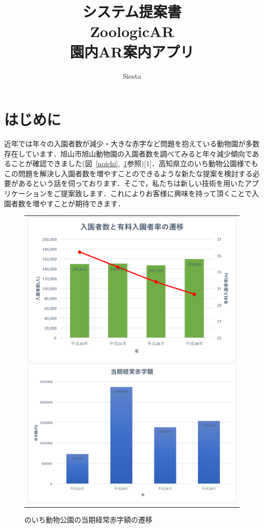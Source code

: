 \documentclass[a4j]{jarticle}
\title{
\vspace{30mm}
{\bf システム提案書} 
\\
\vspace{5mm}
{\bf ZoologicAR \\園内AR案内アプリ}
\vspace{90mm}
}
\author{
\vspace{5mm}
Siesta \\
}
\begin{document}
\maketitle

\newpage

\tableofcontents

\newpage

\section{はじめに}
近年では年々の入園者数が減少・大きな赤字など問題を抱えている動物園が多数存在しています．旭山市旭山動物園の入園者数を調べてみると年々減少傾向であることが確認できました(図~\ref{noichi},~\ref{noichi_akaji}参照)[1]．高知県立のいち動物公園様でもこの問題を解決し入園者数を増やすことのできるような新たな提案を検討する必要があるという話を伺っております．そこで，私たちは新しい技術を用いたアプリケーションをご提案致します．これによりお客様に興味を持って頂くことで入園者数を増やすことが期待できます．

\begin{figure}[htb]
	\begin{center}
		\begin{tabular}{c}
			\begin{minipage}{0.5\hsize}
				\begin{center}
					\includegraphics[width=0.6 \linewidth]{noichi.png}
					\caption{のいち動物公園の入園者数の遷移}
					\label{noichi}
				\end{center}
			\end{minipage}
			\begin{minipage}{0.5\hsize}
				\begin{center}
					\includegraphics[width=0.6 \linewidth]{noichi_akaji.png}
					\caption{のいち動物公園の当期経常赤字額の遷移}
					\label{noichi_akaji}
				\end{center}
			\end{minipage}
		\end{tabular}
	\end{center}
\end{figure}
\end{document}
